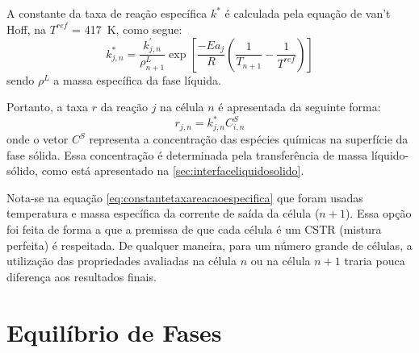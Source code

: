 A constante da taxa de reação específica $k^{*}$ é calculada pela
equação de van't Hoff, na $T^{ref}$ = \SI{417}{K}, como segue:
\begin{equation}
k^{*}_{j,n} = \dfrac{k^{'}_{j,n}} {\rho^{L}_{n+1}} \exp
\left[{\dfrac{-Ea_j}{R} \left (\dfrac{1}{T_{n+1}} -
\dfrac{1}{T^{ref}} \right )}\right]
\label{eq:constantetaxareacaoespecifica}
\end{equation}
sendo $\rho^L$ a massa específica da fase líquida.

Portanto, a taxa $r$ da reação $j$ na célula $n$ é apresentada da seguinte
forma:
\begin{equation}
r_{j,n} = k^{*}_{j,n}C^{S}_{i,n}
\label{eq:taxareacao}
\end{equation}
onde o vetor $C^{S}$ representa a concentração das espécies químicas na
superfície da fase sólida. Essa concentração é determinada pela transferência de
massa líquido-sólido, como está apresentado na \autoref{sec:interfaceliquidosolido}.

Nota-se na equação \autoref{eq:constantetaxareacaoespecifica} que foram usadas
temperatura e massa específica da corrente de saída da célula ($n+1$).
Essa opção foi feita de forma a que a premissa de que cada célula
é um CSTR (mistura perfeita) é respeitada.
De qualquer maneira, para um número grande de células, a utilização das propriedades
avaliadas na célula $n$ ou na célula $n+1$ traria pouca diferença aos resultados
finais.


\section{Equilíbrio de Fases} \label{sec:termodinamica}

